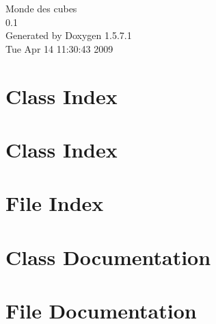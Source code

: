 \documentclass[a4paper]{book}
\begin{document}
\begin{titlepage}
\vspace*{7cm}
\begin{center}
{\Large Monde des cubes \\[1ex]\large 0.1 }\\
\vspace*{1cm}
{\large Generated by Doxygen 1.5.7.1}\\
\vspace*{0.5cm}
{\small Tue Apr 14 11:30:43 2009}\\
\end{center}
\end{titlepage}
\clearemptydoublepage
{}
\tableofcontents
\clearemptydoublepage
{}
\chapter{Class Index}

\chapter{Class Index}

\chapter{File Index}

\chapter{Class Documentation}








\chapter{File Documentation}









\printindex
\end{document}
